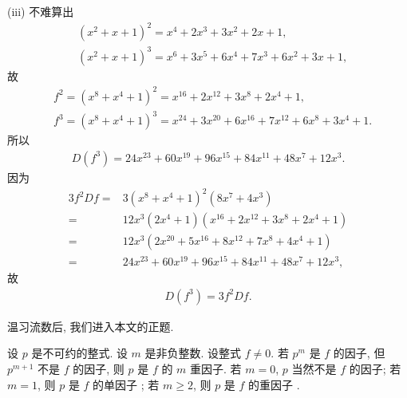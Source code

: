 \begin{example}
    (iii) 不难算出
    \begin{align*}
         & (x^2 + x + 1)^2 = x^4+2 x^3+3 x^2+2 x+1,             \\
         & (x^2 + x + 1)^3 = x^6+3 x^5+6 x^4+7 x^3+6 x^2+3 x+1,
    \end{align*}
    故
    \begin{align*}
         & f^2 = (x^8 + x^4 + 1)^2 = x^{16}+2 x^{12}+3 x^8+2 x^4+1,                   \\
         & f^3 = (x^8 + x^4 + 1)^3 = x^{24}+3 x^{20}+6 x^{16}+7 x^{12}+6 x^8+3 x^4+1.
    \end{align*}
    所以
    \begin{align*}
        D(f^3) = 24 x^{23}+60 x^{19}+96 x^{15}+84 x^{11}+48 x^7+12 x^3.
    \end{align*}
    因为
    \begin{align*}
        3f^2 Df
        = {} & 3(x^8 + x^4 + 1)^2 (8x^7 + 4x^3)                       \\
        = {} & 12 x^3 (2x^4 + 1) (x^{16}+2 x^{12}+3 x^8+2 x^4+1)      \\
        = {} & 12 x^3 (2 x^{20}+5 x^{16}+8 x^{12}+7 x^8+4 x^4+1)      \\
        = {} & 24 x^{23}+60 x^{19}+96 x^{15}+84 x^{11}+48 x^7+12 x^3,
    \end{align*}
    故
    \begin{align*}
        D(f^3) = 3f^2 Df.
    \end{align*}
\end{example}

\myLine

温习流数后, 我们进入本文的正题.

\begin{definition}
    设 $p$ 是不可约的整式. 设 $m$ 是非负整数. 设整式 $f \neq 0$. 若 $p^m$ 是 $f$ 的因子, 但 $p^{m+1}$ 不是 $f$ 的因子, 则 $p$ 是 $f$ 的 $m$ 重因子. 若 $m = 0$, $p$ 当然不是 $f$ 的因子; 若 $m = 1$, 则 $p$ 是 $f$ 的单因子 ; 若 $m \geq 2$, 则 $p$ 是 $f$ 的重因子 .
\end{definition}

